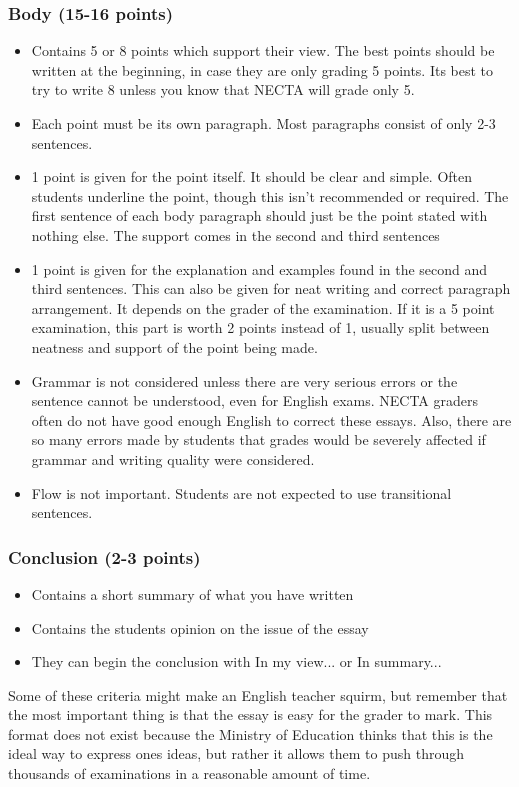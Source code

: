\subsubsection{Body (15-16 points)}
\begin{itemize}
\item Contains 5 or 8 points which support their view.  The best points should be written at the beginning, in case they are only grading 5 points.  Its best to try to write 8 unless you know that NECTA will grade only 5.
\item Each point must be its own paragraph.  Most paragraphs consist of only 2-3 sentences.
\item 1 point is given for the point itself.  It should be clear and simple.  Often students underline the point, though this isn't recommended or required.  The first sentence of each body paragraph should just be the point stated with nothing else.  The support comes in the second and third sentences
\item 1 point is given for the explanation and examples found in the second and third sentences.  This can also be given for neat writing and correct paragraph arrangement.  It depends on the grader of the examination.  If it is a 5 point examination, this part is worth 2 points instead of 1, usually split between neatness and support of the point being made.
\item Grammar is not considered unless there are very serious errors or the sentence cannot be understood, even for English exams.  NECTA graders often do not have good enough English to correct these essays.  Also, there are so many errors made by students that grades would be severely affected if grammar and writing quality were considered.
\item Flow is not important.  Students are not expected to use transitional sentences.
\end{itemize}

 
\subsubsection{Conclusion (2-3 points)}
\begin{itemize}
\item Contains a short summary of what you have written
\item Contains the students opinion on the issue of the essay
\item They can begin the conclusion with In my view... or In summary...
\end{itemize}

Some of these criteria might make an English teacher squirm, but remember that the most important thing is that the essay is easy for the grader to mark.  This format does not exist because the Ministry of Education thinks that this is the ideal way to express ones ideas, but rather it allows them to push through thousands of examinations in a reasonable amount of time.